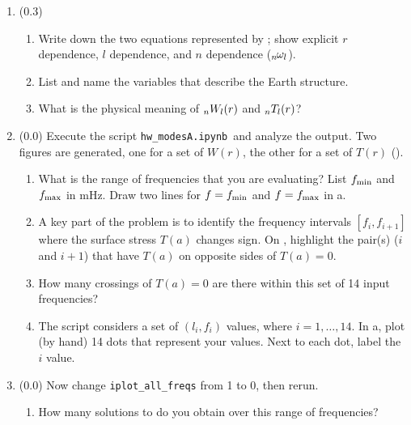 \documentclass[11pt,titlepage,fleqn]{article}
\newcommand{\tfileA}{{\tt hw\_modesA.ipynb}}
\begin{document}
\begin{enumerate}
\item (0.3)
%
\begin{enumerate}
\item Write down the two equations represented by ; show explicit $r$ dependence, $l$ dependence, and $n$ dependence (\eg $\mbox{${}_{n\hspace{-0.2 mm}}\omega_l$}$).
\item List and name the variables that describe the Earth structure.

\item What is the physical meaning of $\mbox{${}_nW_l$}(r)$ and $\mbox{${}_nT_l$}(r)$?
\end{enumerate}


\item (0.0) Execute the script \tfileA\  and analyze the output. Two figures are generated, one for a set of $W(r)$, the other for a set of $T(r)$ ().
%
\begin{enumerate}
\item What is the range of frequencies that you are evaluating? List $f_{\rm min}$ and $f_{\rm max}$ in mHz. Draw two lines for $f = f_{\rm min}$ and $f = f_{\rm max}$ in a.

\item A key part of the problem is to identify the frequency intervals $[f_i, f_{i+1}]$ where the surface stress $T(a)$ changes sign. On , highlight the pair(s) ($i$ and $i+1$) that have $T(a)$ on opposite sides of $T(a) = 0$.

\item How many crossings of $T(a) = 0$ are there within this set of 14 input frequencies?

\item The script considers a set of $(l_i, f_i)$ values, where $i = 1, \ldots, 14$. In a, plot (by hand) 14 dots that represent your values. Next to each dot, label the $i$ value.

\end{enumerate}

\label{prob:Tr}


\item (0.0) Now change \verb+iplot_all_freqs+ from 1 to 0, then rerun.
%
\begin{enumerate}
\item How many solutions to  do you obtain over this range of frequencies?


\end{enumerate}
\end{enumerate}
\end{document}

